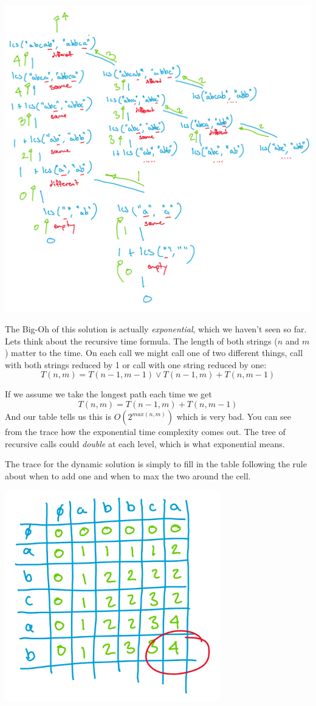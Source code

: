 \documentclass[twoside=false,DIV=14]{scrartcl}
\begin{document}
\includegraphics[width=\textwidth]{lcs_recursive.jpeg}

The Big-Oh of this solution is actually \emph{exponential}, which we haven't seen so far.  Lets think about the recursive time formula.  The length of both strings ($n$ and $m$) matter to the time.  On each call we might call one of two different things, call with both strings reduced by 1 or call with one string reduced by one:
$$
T(n,m) = T(n-1, m-1) \lor T(n-1, m) + T(n, m-1)
$$

If we assume we take the longest path each time we get 
$$
T(n,m) = T(n-1, m) + T(n, m-1)
$$
And our table tells us this is $O(2^{max(n,m)})$ which is very bad.  You can see from the trace how the exponential time complexity comes out.  The tree of recursive calls could \emph{double} at each level, which is what exponential means.

The trace for the dynamic solution is simply to fill in the table following the rule about when to add one and when to max the two around the cell.

\includegraphics[width=0.7\textwidth]{lcs_dynamic.jpeg}
\end{document}
